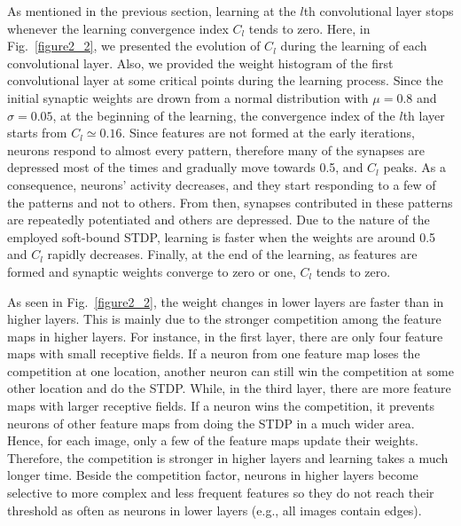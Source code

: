 \documentclass[preprint,5p,12pt,twocolumn]{article}
\begin{document}
As mentioned in the previous section, learning at the $l$th convolutional layer stops whenever the learning convergence index $C_l$ tends to zero. Here, in Fig.~\ref{figure2_2}, we presented the evolution of $C_l$ during the learning of each convolutional layer. Also, we provided the weight histogram of the first convolutional layer at some critical points during the learning process. Since the initial synaptic weights are drown from a  normal distribution with $\mu=0.8$ and $\sigma=0.05$, at the beginning of the learning, the convergence index of the  $l$th layer starts from $C_l\simeq 0.16$. Since features are not formed at the early iterations, neurons respond to  almost every pattern, therefore many of the synapses are depressed most of the times and gradually move towards 0.5, and $C_l$ peaks. As a consequence, neurons' activity  decreases, and they start responding to a few of the patterns and not to others. From then, synapses contributed in these patterns are repeatedly potentiated and others are depressed. Due to the nature of the employed soft-bound STDP, learning is faster when the weights are around 0.5 and $C_l$ rapidly decreases. Finally, at the end of the learning, as features are formed and synaptic weights converge to zero or one, $C_l$ tends to zero. 

As seen in  Fig.~\ref{figure2_2}, the weight changes in lower layers are faster than in higher layers. This is mainly due to the stronger competition among the feature maps in higher layers. For instance, in the first layer, there are only four feature maps with small receptive fields. If a neuron from one feature map loses the competition at one location, another neuron can still win the competition at some other location and do the STDP. While, in the third layer, there are more feature maps with larger receptive fields. If a neuron wins the competition, it prevents neurons of other feature maps from doing the STDP in a much wider area. Hence, for each image, only a few of the feature maps update their weights.  Therefore, the competition is stronger in higher layers and learning takes a much longer time. Beside the competition factor, neurons in higher layers become selective to more complex and less frequent features so they do not reach their threshold as often as  neurons  in lower layers (e.g., all images contain edges).
\end{document}
